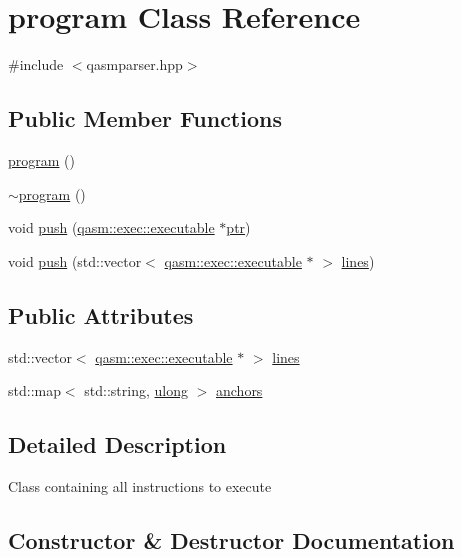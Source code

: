\hypertarget{classprogram}{}\section{program Class Reference}
\label{classprogram}


{\ttfamily \#include $<$qasmparser.\+hpp$>$}

\subsection*{Public Member Functions}
\begin{DoxyCompactItemize}
\item 
\hyperlink{classprogram_a0772f916267bdb0eb4d803ea472e8e74}{program} ()
\item 
\hyperlink{classprogram_a31e130840978c25ba94a6ff2b192011c}{$\sim$program} ()
\item 
void \hyperlink{classprogram_ada37ef3924e109909695ef9bd55f54b3}{push} (\hyperlink{classqasm_1_1exec_1_1executable}{qasm\+::exec\+::executable} $\ast$\hyperlink{classptr}{ptr})
\item 
void \hyperlink{classprogram_a40b1420af44c92684d8ecc035f8d004c}{push} (std\+::vector$<$ \hyperlink{classqasm_1_1exec_1_1executable}{qasm\+::exec\+::executable} $\ast$ $>$ \hyperlink{classprogram_a827f0b22e21be3ce1e0e568a147488b9}{lines})
\end{DoxyCompactItemize}
\subsection*{Public Attributes}
\begin{DoxyCompactItemize}
\item 
std\+::vector$<$ \hyperlink{classqasm_1_1exec_1_1executable}{qasm\+::exec\+::executable} $\ast$ $>$ \hyperlink{classprogram_a827f0b22e21be3ce1e0e568a147488b9}{lines}
\item 
std\+::map$<$ std\+::string, \hyperlink{types_8h_ab2bb0e5480d1d957383df6b350794313}{ulong} $>$ \hyperlink{classprogram_ae17b7e99958aa0770b1cc4a8c20acbfe}{anchors}
\end{DoxyCompactItemize}


\subsection{Detailed Description}
Class containing all instructions to execute 

\subsection{Constructor \& Destructor Documentation}
